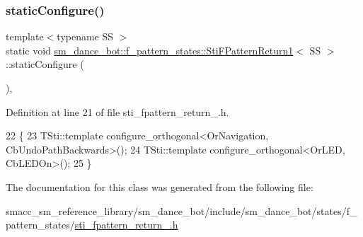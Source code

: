 \subsubsection{\texorpdfstring{static\+Configure()}{staticConfigure()}}
{\footnotesize\ttfamily template$<$typename SS $>$ \\
static void \hyperlink{structsm__dance__bot_1_1f__pattern__states_1_1StiFPatternReturn1}{sm\+\_\+dance\+\_\+bot\+::f\+\_\+pattern\+\_\+states\+::\+Sti\+F\+Pattern\+Return1}$<$ SS $>$\+::static\+Configure (\begin{DoxyParamCaption}{ }\end{DoxyParamCaption})\hspace{0.3cm}{\ttfamily [inline]}, {\ttfamily [static]}}



Definition at line 21 of file sti\+\_\+fpattern\+\_\+return\+\_.\+h.


\begin{DoxyCode}
22   \{
23     TSti::template configure\_orthogonal<OrNavigation, CbUndoPathBackwards>();
24     TSti::template configure\_orthogonal<OrLED, CbLEDOn>();
25   \}
\end{DoxyCode}


The documentation for this class was generated from the following file\+:\begin{DoxyCompactItemize}
\item 
smacc\+\_\+sm\+\_\+reference\+\_\+library/sm\+\_\+dance\+\_\+bot/include/sm\+\_\+dance\+\_\+bot/states/f\+\_\+pattern\+\_\+states/\hyperlink{include_2sm__dance__bot_2states_2f__pattern__states_2sti__fpattern__return__1_8h}{sti\+\_\+fpattern\+\_\+return\+\_.\+h}\end{DoxyCompactItemize}
